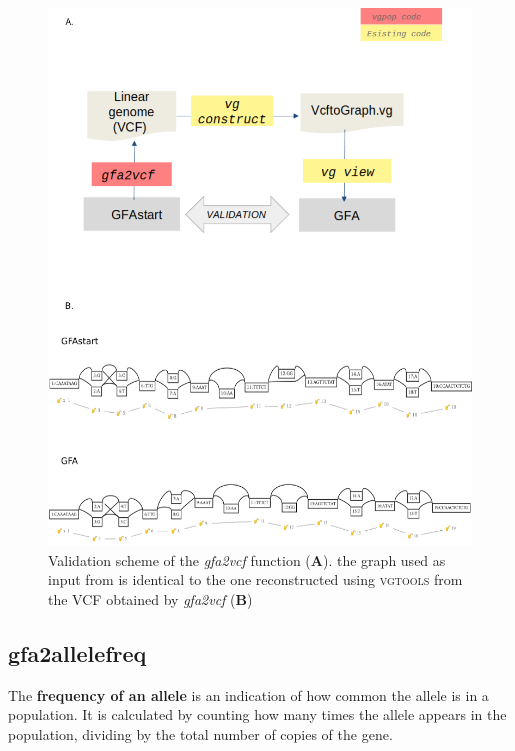 \begin{figure}[H]
\centering
\includegraphics[width=0.80 \textwidth]{fig/validationgfa2.vcf.png}
\decoRule
\caption{Validation scheme of the \textit{gfa2vcf} function (\textbf{A}). the graph used as input from \vgp is identical to the one reconstructed using \textsc{vgtools} from the VCF obtained by \textit{gfa2vcf} (\textbf{B})}
\label{fig:validationgraph.png}
\end{figure}


\subsection{gfa2allelefreq} 

The \textbf{frequency of an allele} is an indication of how common the allele is in a population. It is calculated by counting how many times the allele appears in the population, dividing by the total number of copies of the gene.\\

